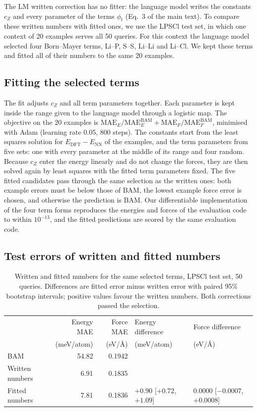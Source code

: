 The LM written correction has no fitter: the language model writes the constants $c_Z$ and every parameter of the terms $\phi_t$ (Eq.~3 of the main text). To compare these written numbers with fitted ones, we use the LPSCl test set, in which one context of 20 examples serves all 50 queries. For this context the language model selected four Born--Mayer terms, Li--P, S--S, Li--Li and Li--Cl. We kept these terms and fitted all of their numbers to the same 20 examples.

\subsection{Fitting the selected terms}

The fit adjusts $c_Z$ and all term parameters together. Each parameter is kept inside the range given to the language model through a logistic map. The objective on the 20 examples is $\mathrm{MAE}_E/\mathrm{MAE}_E^{\mathrm{BAM}}+\mathrm{MAE}_F/\mathrm{MAE}_F^{\mathrm{BAM}}$, minimised with Adam (learning rate 0.05, 800 steps). The constants start from the least squares solution for $E_{\mathrm{DFT}}-E_{\mathrm{NN}}$ of the examples, and the term parameters from five sets: one with every parameter at the middle of its range and four random. Because $c_Z$ enter the energy linearly and do not change the forces, they are then solved again by least squares with the fitted term parameters fixed. The five fitted candidates pass through the same selection as the written ones: both example errors must be below those of BAM, the lowest example force error is chosen, and otherwise the prediction is BAM. Our differentiable implementation of the four term forms reproduces the energies and forces of the evaluation code to within $10^{-13}$, and the fitted predictions are scored by the same evaluation code.

\subsection{Test errors of written and fitted numbers}

\begin{table}[ht]
\caption{Written and fitted numbers for the same selected terms, LPSCl test set, 50 queries. Differences are fitted error minus written error with paired 95\% bootstrap intervals; positive values favour the written numbers. Both corrections passed the selection.}
\label{tab:fit}
\footnotesize
\centering
\begin{tabular}{lrrll}
\toprule
 & Energy MAE & Force MAE & Energy difference & Force difference \\
 & (meV/atom) & (eV/\AA) & (meV/atom) & (eV/\AA) \\
\midrule
BAM & 54.82 & 0.1942 & & \\
Written numbers & 6.91 & 0.1835 & & \\
Fitted numbers & 7.81 & 0.1836 & $+0.90$ [$+0.72$, $+1.09$] & $0.0000$ [$-0.0007$, $+0.0008$] \\
\bottomrule
\end{tabular}
\end{table}

